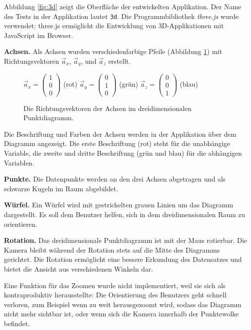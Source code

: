 Abbildung \ref{fig:3d} zeigt die Oberfläche der entwickelten Applikation. Der Name des Tests in der Applikation lautet \texttt{3d}. Die Programmbibliothek \textit{three.js} \cite{threejs} wurde verwendet; three.js ermöglicht die Entwicklung von 3D-Applikationen mit JavaScript im Browser.

\textbf{Achsen.} Als Achsen wurden verschiedenfarbige Pfeile (Abbildung \ref{fig:vectors}) mit Richtungsvektoren $\vec{a}_x$, $\vec{a}_y$, und $\vec{a}_z$ erstellt.

\begin{figure}[H]
	\centering
	$\vec{a}_x=\begin{pmatrix} 1 \\ 0 \\ 0 \end{pmatrix}$ (rot)\qquad
	$\vec{a}_y=\begin{pmatrix} 0 \\ 1 \\ 0 \end{pmatrix}$ (grün)\qquad
	$\vec{a}_z=\begin{pmatrix} 0 \\ 0 \\ 1 \end{pmatrix}$ (blau)\qquad
	\caption{Die Richtungsvektoren der Achsen im dreidimensionalen Punktdiagramm.}
	\label{fig:vectors}
\end{figure}

Die Beschriftung und Farben der Achsen werden in der Applikation über dem Diagramm angezeigt. Die erste Beschriftung (rot) steht für die unabhängige Variable, die zweite und dritte Beschriftung (grün und blau) für die abhängigen Variablen.

\textbf{Punkte.} Die Datenpunkte werden an den drei Achsen abgetragen und als schwarze Kugeln im Raum abgebildet.

\textbf{Würfel.} Ein Würfel wird mit gestrichelten grauen Linien um das Diagramm dargestellt. Es soll dem Benutzer helfen, sich in dem dreidimensionalen Raum zu orientieren.

\textbf{Rotation.} Das dreidimensionale Punktdiagramm ist mit der Maus rotierbar. Die Kamera bleibt während der Rotation stets auf die Mitte des Diagramms gerichtet. Die Rotation ermöglicht eine bessere Erkundung des Datensatzes und bietet die Ansicht aus verschiedenen Winkeln dar.

Eine Funktion für das Zoomen wurde nicht implementiert, weil sie sich als kontraproduktiv herausstellte: Die Orientierung des Benutzers geht schnell verloren, zum Beispiel wenn zu weit herausgezoomt wird, sodass das Diagramm nicht mehr sichtbar ist, oder wenn sich die Kamera innerhalb der Punktewolke befindet.

